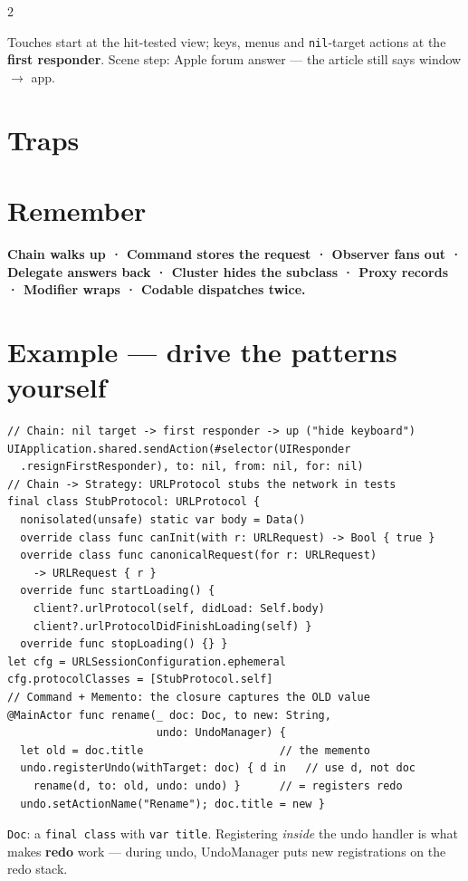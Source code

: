\documentclass[8pt]{extarticle}
\begin{document}
\begin{multicols}{2}
{\footnotesize Touches start at the hit-tested view; keys, menus and \texttt{nil}-target actions
at the \textbf{first responder}. Scene step: Apple forum answer — the article still says
window $\to$ app.\par}

\section{Traps}
\begin{itemize}
\end{itemize}

\section{Remember}
\textbf{Chain walks up · Command stores the request · Observer fans out · Delegate answers back ·
Cluster hides the subclass · Proxy records · Modifier wraps · Codable dispatches twice.}

\columnbreak

\section{Example — drive the patterns yourself}
\begin{lstlisting}[language=SwiftSheet]
// Chain: nil target -> first responder -> up ("hide keyboard")
UIApplication.shared.sendAction(#selector(UIResponder
  .resignFirstResponder), to: nil, from: nil, for: nil)
// Chain -> Strategy: URLProtocol stubs the network in tests
final class StubProtocol: URLProtocol {
  nonisolated(unsafe) static var body = Data()
  override class func canInit(with r: URLRequest) -> Bool { true }
  override class func canonicalRequest(for r: URLRequest)
    -> URLRequest { r }
  override func startLoading() {
    client?.urlProtocol(self, didLoad: Self.body)
    client?.urlProtocolDidFinishLoading(self) }
  override func stopLoading() {} }
let cfg = URLSessionConfiguration.ephemeral
cfg.protocolClasses = [StubProtocol.self]
// Command + Memento: the closure captures the OLD value
@MainActor func rename(_ doc: Doc, to new: String,
                       undo: UndoManager) {
  let old = doc.title                     // the memento
  undo.registerUndo(withTarget: doc) { d in   // use d, not doc
    rename(d, to: old, undo: undo) }      // = registers redo
  undo.setActionName("Rename"); doc.title = new }
\end{lstlisting}
{\footnotesize \texttt{Doc}: a \texttt{final class} with \texttt{var title}. Registering
\emph{inside} the undo handler is what makes \textbf{redo} work — during undo, UndoManager puts
new registrations on the redo stack.\par}



\end{multicols}
\end{document}
